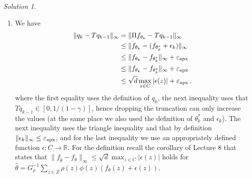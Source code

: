 \documentclass{article}
\newcommand{\norm}[1]{\| #1 \|}
\newcommand{\R}{\mathbb{R}}
\DeclareMathOperator*{\1}{\mathbbm{1}}
\newcommand{\0}{\mathbf{0}}
\theoremstyle{definition}
\theoremstyle{remark}
\newtheorem*{solution*}{Solution}
\theoremstyle{theorem}
\begin{document}
\begin{solution*}
\begin{enumerate}
\item 
We have 
\begin{align*}
\norm{q_k - T q_{k-1}}_\infty 
& =
\norm{ \Pi f_{\theta_k} - T q_{k-1}}_\infty \\
& \le
\norm{ f_{\theta_k} - (f_{\theta_k^*} + \epsilon_k) }_\infty\\
&\le
\norm{ f_{\theta_k} - f_{\theta_k^*}}_\infty + \epx\\
& \le
\norm{ f_{\theta_k} - f_{\theta_k^*}}_\infty + \epx\\
& \leq 
\sqrt{d} \max_{z\in C} |\epsilon(z)| + \epx\,,
\end{align*}
where the first equality uses the definition of $q_k$,
the next inequality uses that $T q_{k-1}\in [0,1/(1-\gamma)]$, hence dropping the truncation can only increase the values (at the same place we also used the
definition of $\theta_k^*$ and $\epsilon_k$).
The next inequality uses the triangle inequality and that by definition $\norm{\epsilon_k}_\infty \le \epx$,
and for 
%
the last inequality we use an appropriately defined function $\epsilon: C \to \R$.
For the definition recall the corollary of Lecture 8 that states that $\norm{f_{\hat\theta}-f_\theta}_\infty \le \sqrt{d} \max_{z\in C} |\epsilon(z)|$ holds for $\hat\theta = G_\rho^{-1} \sum_{z\in Z} \rho(z) \phi(z) (f_\theta(z) + \epsilon(z))$.

\end{enumerate}
\end{solution*}
\end{document}

